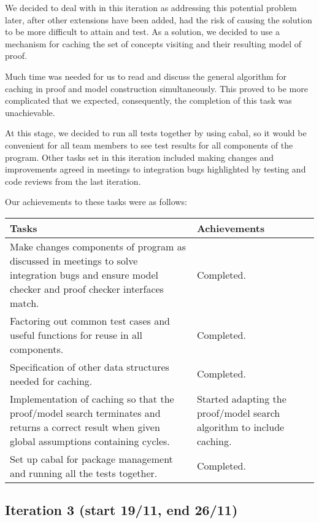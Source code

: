 We decided to deal with in this iteration as addressing this potential problem later, after other extensions have been added, had the risk of causing the solution to be more difficult to attain and test. As a solution, we decided to use a mechanism for caching the set of concepts visiting and their resulting model of proof.

Much time was needed for us to read and discuss the general algorithm for caching in proof and model construction simultaneously. This proved to be more complicated that we expected, consequently, the completion of this task was unachievable.

At this stage, we decided to run all tests together by using cabal, so it would be convenient for all team members to see test results for all components of the program. Other tasks set in this iteration included making changes and improvements agreed in meetings to integration bugs highlighted by testing and code reviews from the last iteration.

Our achievements to these tasks were as follows:

\begin{center}
\begin{longtable}{| p{7cm} | p{8cm} |}
\hline
\textbf{Tasks} & \textbf{Achievements} \\
\hline
Make changes components of program as discussed in meetings to solve integration bugs and ensure model checker and proof checker interfaces match. & Completed.\\
\hline
Factoring out common test cases and useful functions for reuse in all components. & Completed.\\
\hline
Specification of other data structures needed for caching. & Completed.\\
\hline
Implementation of caching so that the proof/model search terminates and returns a correct result when given global assumptions containing cycles. & Started adapting the proof/model search algorithm to include caching.\\
\hline
Set up cabal for package management and running all the tests together. & Completed.\\
\hline
\end{longtable}
\end{center}

\subsection*{Iteration 3 (start 19/11, end 26/11)}

